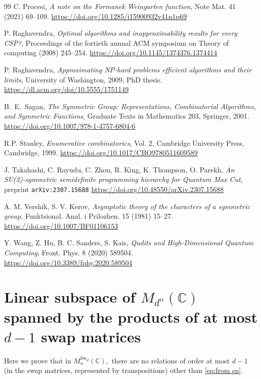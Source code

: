 \documentclass[12pt,dvipsnames,accepted=2016-08-18,a4paper,onecolumn]{quantumarticle}
\numberwithin{equation}{section}
\theoremstyle{definition}
\begin{document}
\begin{thebibliography}{99}
C. Procesi, 
\textit{A note on the Formanek Weingarten function}, 
Note Mat. 41 (2021) 69--109.
\url{https://doi.org/10.1285/i15900932v41n1p69}

 P. Raghavendra, \textit{Optimal algorithms and inapproximability results for
 every CSP?}, Proceedings of the fortieth annual ACM symposium on Theory
 of computing (2008) 245--254. \url{https://doi.org/10.1145/1374376.1374414}

  P. Raghavendra, \textit{Approximating NP-hard problems efficient algorithms and
 their limits}, University of Washington, 2009, PhD thesis. \url{https://dl.acm.org/doi/10.5555/1751149}

B.~E.~Sagan, \textit{The Symmetric Group: Representations, Combinatorial Algorithms, and Symmetric Functions},
 Graduate Texts in Mathematics 203, Springer, 2001.
 \url{https://doi.org/10.1007/978-1-4757-6804-6}


R.P. Stanley, \textit{Enumerative combinatorics}, Vol. 2,  Cambridge University Press, Cambridge,
 1999.
 \url{https://doi.org/10.1017/CBO9780511609589}

J. Takahashi, C. Rayudu, C. Zhou, R. King, K. Thompson,
O. Parekh, 
\textit{An SU(2)-symmetric semidefinite programming hierarchy for Quantum Max Cut}, preprint
\texttt{arXiv:2307.15688}
\url{https://doi.org/10.48550/arXiv.2307.15688}

A. M. Vershik, S. V. Kerov,
\textit{Asymptotic theory of the characters of a symmetric group}, 
Funktsional. Anal. i Prilozhen. 15 (1981) 15--27.
\url{https://doi.org/10.1007/BF01106153}

Y. Wang, Z. Hu, B. C. Sanders, S. Kais,
\textit{Qudits and High-Dimensional Quantum Computing},
Front. Phys. 8 (2020) 589504.
\url{https://doi.org/10.3389/fphy.2020.589504}


\end{thebibliography}


\newpage
 \appendix



\section{Linear subspace of $M_{d^n}(\mathbb{C})$ spanned by the products of at most $d-1$ swap matrices}\label{a:d-1}
 Here we prove that in $M^{\text{Sw}_d}_n(\mathbb{C}),$ there are no relations of order at most $d-1$ (in the swap matrices, represented by transpositions) other than \eqref{eq:from sn}.
\end{document}
